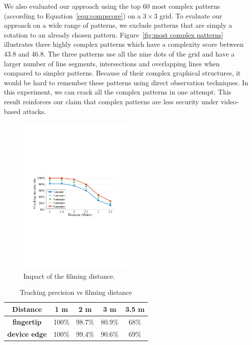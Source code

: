        We also evaluated our approach using the top 60 most complex
        patterns (according to Equation~\ref {equ:compscore}) on a $3 \times 3$
        grid.
        To evaluate our approach on a wide range of patterns, we exclude patterns that are simply a rotation to an already chosen pattern.
         Figure~\ref {fig:most complex patterns} illustrates three
        highly complex patterns which have a complexity score between 43.8 and 46.8. The three
        patterns use all the nine dots of the grid and have a larger number of line segments, intersections and overlapping lines when compared to simpler patterns.
        Because of their complex graphical structures, it would be hard to remember
        these patterns using direct observation techniques.
        In this experiment, we can crack all the complex patterns in one attempt. This result reinforces our claim that complex
        patterns are less security under video-based attacks.

        \begin{figure}[t!]
            \centering
            \includegraphics[width=0.5\textwidth]{fig/12.pdf}
            \caption{Impact of the filming distance.}
            \label{fig:fig12}
        \end{figure}

        \begin{table}[!t]
            \centering
            \caption{Tracking precision vs filming distance}
            \vspace{-0.2mm}
            \label{tab:tab1}
            \small
            \begin{tabular}{ccccc}
                \toprule
                \textbf{Distance}& 1 m & 2 m & 3 m & 3.5 m \\
                \midrule
                \textbf{fingertip}  & 100\% & 98.7\% & 80.9\% & 68\% \\
                \textbf{device edge} & 100\% & 99.4\% & 90.6\% & 69\% \\
                \bottomrule
            \end{tabular}
            \vspace{-5mm}
        \end{table}

